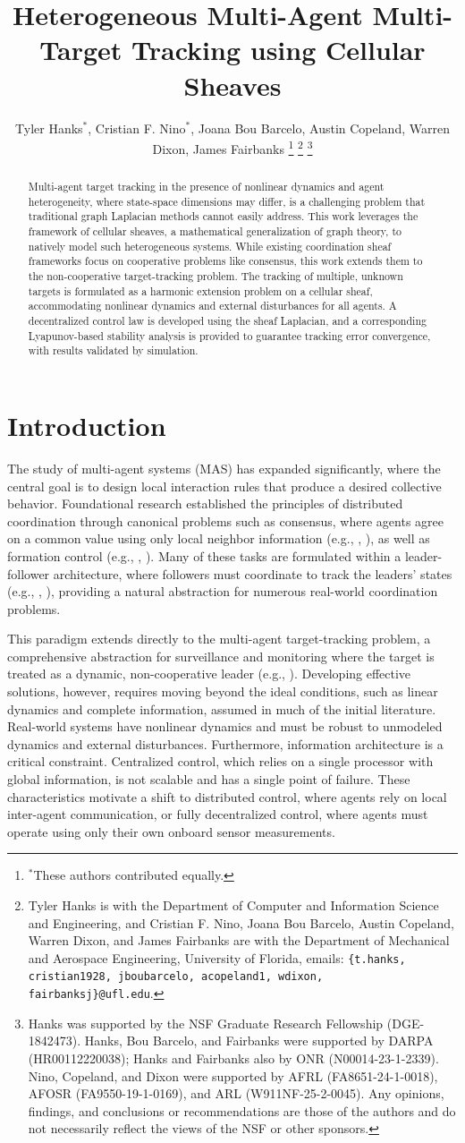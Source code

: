 \documentclass[letterpaper, 10 pt, conference]{ieeeconf}
\title{\LARGE \bf  Heterogeneous Multi-Agent Multi-Target Tracking using Cellular Sheaves}
\author{Tyler Hanks$^{\ast}$, Cristian F. Nino$^{\ast}$, Joana Bou Barcelo, Austin Copeland, Warren Dixon, James Fairbanks
\thanks{$^\ast$These authors contributed equally.}
\thanks{Tyler Hanks is with the Department of Computer and Information Science and Engineering, and Cristian F. Nino, Joana Bou Barcelo, Austin Copeland, Warren Dixon, and James Fairbanks are with the Department of Mechanical and Aerospace Engineering, University of Florida, emails:
        {\tt\small \{t.hanks, cristian1928, jboubarcelo, acopeland1, wdixon, fairbanksj\}@ufl.edu}.} 
\thanks{Hanks was supported by the NSF Graduate Research Fellowship (DGE-1842473). Hanks, Bou Barcelo, and Fairbanks were supported by DARPA (HR00112220038); Hanks and Fairbanks also by ONR (N00014-23-1-2339). Nino, Copeland, and Dixon were supported by AFRL (FA8651-24-1-0018), AFOSR (FA9550-19-1-0169), and ARL (W911NF-25-2-0045). Any opinions, findings, and conclusions or recommendations are those of the authors and do not necessarily reflect the views of the NSF or other sponsors.}
}
\theoremstyle{definition}
\begin{document}
\maketitle
\thispagestyle{empty}
\pagestyle{empty}

\begin{abstract}
    Multi-agent target tracking in the presence of nonlinear dynamics and agent heterogeneity, where state-space dimensions may differ, is a challenging problem that traditional graph Laplacian methods cannot easily address. This work leverages the framework of cellular sheaves, a mathematical generalization of graph theory, to natively model such heterogeneous systems. While existing coordination sheaf frameworks focus on cooperative problems like consensus, this work extends them to the non-cooperative target-tracking problem. The tracking of multiple, unknown targets is formulated as a harmonic extension problem on a cellular sheaf, accommodating nonlinear dynamics and external disturbances for all agents. A decentralized control law is developed using the sheaf Laplacian, and a corresponding Lyapunov-based stability analysis is provided to guarantee tracking error convergence, with results validated by simulation.
\end{abstract}

\section{Introduction}

The study of multi-agent systems (MAS) has expanded significantly, where the central goal is to design local interaction rules that produce a desired collective behavior. Foundational research established the principles of distributed coordination through canonical problems such as consensus, where agents agree on a common value using only local neighbor information (e.g., \cite{Olfati-Saber.R2004}, \cite{Olfati-Saber.Reza2007}), as well as formation control (e.g., \cite{Mesbahi.Mehran2010}, \cite{Ren.Wei2013}). Many of these tasks are formulated within a leader-follower architecture, where followers must coordinate to track the leaders' states (e.g., \cite{Fax.J2004}, \cite{Hong.Yiguang2006}), providing a natural abstraction for numerous real-world coordination problems.

This paradigm extends directly to the multi-agent target-tracking problem, a comprehensive abstraction for surveillance and monitoring where the target is treated as a dynamic, non-cooperative leader (e.g., \cite{Nino.Cristian2025}). Developing effective solutions, however, requires moving beyond the ideal conditions, such as linear dynamics and complete information, assumed in much of the initial literature. Real-world systems have nonlinear dynamics and must be robust to unmodeled dynamics and external disturbances. Furthermore, information architecture is a critical constraint. Centralized control, which relies on a single processor with global information, is not scalable and has a single point of failure. These characteristics motivate a shift to distributed control, where agents rely on local inter-agent communication, or fully decentralized control, where agents must operate using only their own onboard sensor measurements.
\end{document}
